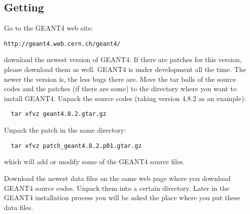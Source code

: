\subsection{Getting \geant}
Go to the GEANT4 web site:
\begin{lstlisting}
http://geant4.web.cern.ch/geant4/
\end{lstlisting}
download the newest version of GEANT4. If there are patches for this version,
please download them as well. GEANT4 is under development all the
time. The newer the version is, the less bugs there are.
Move the tar balls of the source codes and the patches (if there are
some) to the directory where you want to install GEANT4. Unpack the
source codes (taking version 4.8.2 as an example):
\begin{lstlisting}
  tar xfvz geant4.8.2.gtar.gz
\end{lstlisting}
Unpack the patch in the same directory:
\begin{lstlisting}
  tar xfvz patch_geant4.8.2.p01.gtar.gz
\end{lstlisting}
which will add or modify some of the GEANT4 source files.

Download the newest data files on the same web page where you download
GEANT4 source codes. Unpack them into a certain directory. Later in
the GEANT4 installation process you will be asked the place where you
put these data files.

